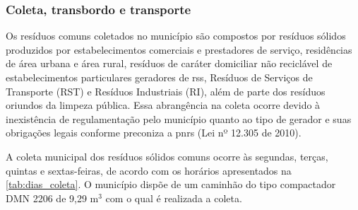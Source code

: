 			
	\subsubsection{Coleta, transbordo e transporte}
	
	Os resíduos comuns coletados no município são compostos por resíduos sólidos produzidos por estabelecimentos comerciais e prestadores de serviço, residências de área urbana e área rural, resíduos de caráter domiciliar não reciclável de estabelecimentos particulares geradores de \gls{rss}, Resíduos de Serviços de Transporte (RST) e Resíduos Industriais (RI), além de parte dos resíduos oriundos da limpeza pública. Essa abrangência na coleta ocorre devido à inexistência de regulamentação pelo município quanto ao tipo de gerador e suas obrigações legais conforme preconiza a \gls{pnrs} (Lei nº 12.305 de 2010).
	
	A coleta municipal dos resíduos sólidos comuns ocorre às segundas, terças, quintas e sextas-feiras, de acordo com os horários apresentados na \autoref{tab:dias_coleta}.  O município dispõe de um caminhão do tipo compactador DMN 2206 de 9,29 m$^{3}$ com o qual é realizada a coleta.
	
